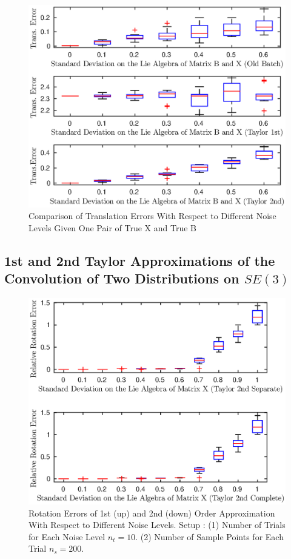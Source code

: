\documentclass[twocolumn,10pt]{asme2ej}
\begin{document}
\begin{figure}[h]
\includegraphics[scale=0.6]{col_mean_trans_error_1_6.eps}
\caption{Comparison of Translation Errors With Respect to Different Noise Levels Given One Pair of True X and True B}
\centering
\end{figure}

\subsection{1st and 2nd Taylor Approximations of the Convolution of Two Distributions on $SE(3)$}
\begin{figure}[h]\label{mean_conv_approx_rot}
\includegraphics[scale = 0.60]{Mean_Definition_Figures/mean_conv_rot_rel_10.eps}
\caption{Rotation Errors of 1st (up) and 2nd (down) Order Approximation With Respect to Different Noise Levels. Setup : (1) Number of Trials for Each Noise Level $n_t = 10$. (2) Number of Sample Points for Each Trial $n_s = 200$. }
\centering
\end{figure}
\end{document}
